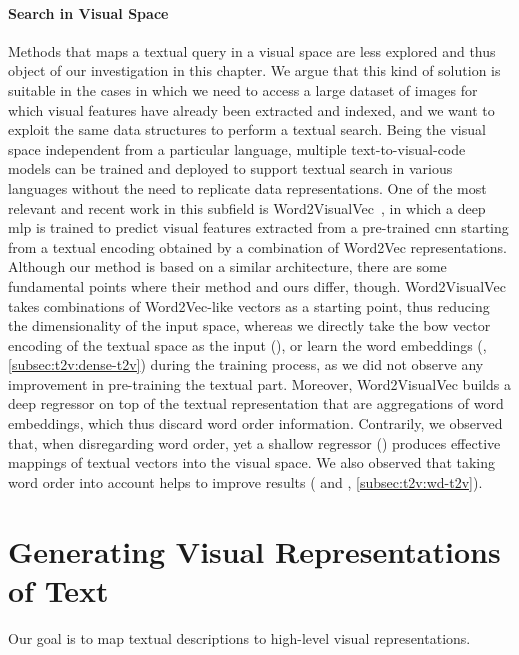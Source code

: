 \paragraph{Search in Visual Space}
Methods that maps a textual query in a visual space are less explored and thus object of our investigation in this chapter.
We argue that this kind of solution is suitable in the cases in which we need to access a large dataset of images for which visual features have already been extracted and indexed, and we want to exploit the same data structures to perform a textual search.
Being the visual space independent from a particular language, multiple text-to-visual-code models can be trained and deployed to support textual search in various languages without the need to replicate data representations.
One of the most relevant and recent work in this subfield is Word2VisualVec~\cite{dong2018predicting}, in which a deep \gls{mlp} is trained to predict visual features extracted from a pre-trained \gls{cnn} starting from a textual encoding obtained by a combination of Word2Vec representations.
Although our method is based on a similar architecture, there are some fundamental points where their method and ours differ, though.
Word2VisualVec takes combinations of Word2Vec-like vectors as a starting point, thus reducing the dimensionality of the input space, whereas we directly take the \acrlong{bow} vector encoding of the textual space as the input (\sparsettv{}), or learn the word embeddings (\densettv{}, \ref{subsec:t2v:dense-t2v}) during the training process, as we did not observe any improvement in pre-training the textual part.
Moreover, Word2VisualVec builds a deep regressor on top of the textual representation that are aggregations of word embeddings, which thus discard word order information.
Contrarily, we observed that, when disregarding word order, yet a shallow regressor (\sparsettv{}) produces effective mappings of textual vectors into the visual space.
We also observed that taking word order into account helps to improve results (\densettv{} and \widedeepttv{}, \ref{subsec:t2v:wd-t2v}).


\section{Generating Visual Representations of Text}
\label{sec:t2v:method}

Our goal is to map textual descriptions to high-level visual representations.

